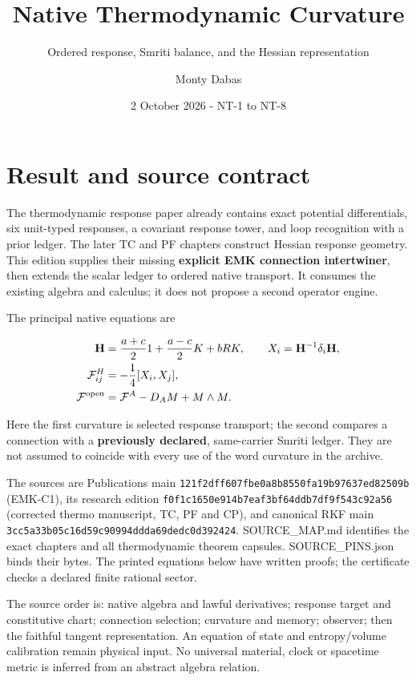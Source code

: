 \documentclass[
  11pt,
]{article}
\title{Native Thermodynamic Curvature}
\subtitle{Ordered response, Smriti balance, and the Hessian
representation}
\author{Monty Dabas}
\date{2 October 2026 - NT-1 to NT-8}
\begin{document}
\maketitle

\hypertarget{result-and-source-contract}{%
\section{Result and source contract}\label{result-and-source-contract}}

The thermodynamic response paper already contains exact potential
differentials, six unit-typed responses, a covariant response tower, and
loop recognition with a prior ledger. The later TC and PF chapters
construct Hessian response geometry. This edition supplies their missing
\textbf{explicit EMK connection intertwiner}, then extends the scalar
ledger to ordered native transport. It consumes the existing algebra and
calculus; it does not propose a second operator engine.

The principal native equations are

\[
\begin{split}
\mathbf H&=\frac{a+c}{2}1+\frac{a-c}{2}K+bRK,\qquad
X_i=\mathbf H^{-1}\delta_i\mathbf H,\\
\mathcal F^H_{ij}&=-\frac14[X_i,X_j],\\
\mathcal F^{\rm open}&=\mathcal F^A-D_A M+M\wedge M.
\end{split}
\]

Here the first curvature is selected response transport; the second
compares a connection with a \textbf{previously declared}, same-carrier
Smriti ledger. They are not assumed to coincide with every use of the
word curvature in the archive.

The sources are Publications main
\texttt{121f2dff607fbe0a8b8550fa19b97637ed82509b} (EMK-C1), its research
edition \texttt{f0f1c1650e914b7eaf3bf64ddb7df9f543c92a56} (corrected
thermo manuscript, TC, PF and CP), and canonical RKF main
\texttt{3cc5a33b05c16d59c90994ddda69dedc0d392424}. SOURCE\_MAP.md
identifies the exact chapters and all thermodynamic theorem capsules.
SOURCE\_PINS.json binds their bytes. The printed equations below have
written proofs; the certificate checks a declared finite rational
sector.

The source order is: native algebra and lawful derivatives; response
target and constitutive chart; connection selection; curvature and
memory; observer; then the faithful tangent representation. An equation
of state and entropy/volume calibration remain physical input. No
universal material, clock or spacetime metric is inferred from an
abstract algebra relation.
\end{document}
